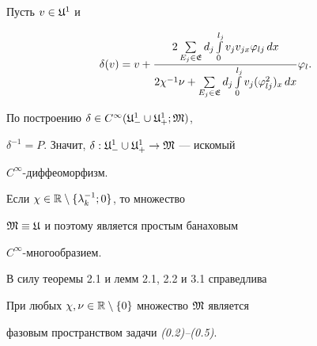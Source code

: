 \begin{pf}


Пусть $v \in \frak{U}^1$ и


$$


\delta(v)=v+\frac{2\sum\limits_{E_j \in \frak{E}}^{}d_j


\int\limits_0^{l_j}v_j v_{jx} \varphi_{lj} \,dx}{2 \chi^{-1} \nu


+\sum\limits_{E_j \in \frak{E}}^{}d_j \int\limits_0^{l_j} v_j


(\varphi^2_{lj})_x \,dx}\varphi_l.


$$


По построению $\delta \in


C^{\infty}(\frak{U}^1_-\cup \frak{U}^1_+; \frak{M})$,


$\delta^{-1}=P$. Значит, $\delta: \frak{U}^1_-\cup


\frak{U}^1_+\rightarrow \frak{M}$ --- искомый


$C^{\infty}$-диффеоморфизм.


\end{pf}








\begin{notes}


Если $\chi \in \Bbb{R}\setminus \{\lambda_k^{-1};0\}$, то множество


$\frak{M}\equiv\frak{U}$ и поэтому является простым банаховым


$C^{\infty}$-многообразием.


\end{notes}





В силу теоремы 2.1 и лемм 2.1, 2.2 и 3.1 справедлива








\begin{thms}


При любых $\chi, \nu \in \Bbb{R}\setminus\{0\}$ множество $\frak{M}$ является


фазовым пространством задачи {\em (0.2)--(0.5)}.


\end{thms}








